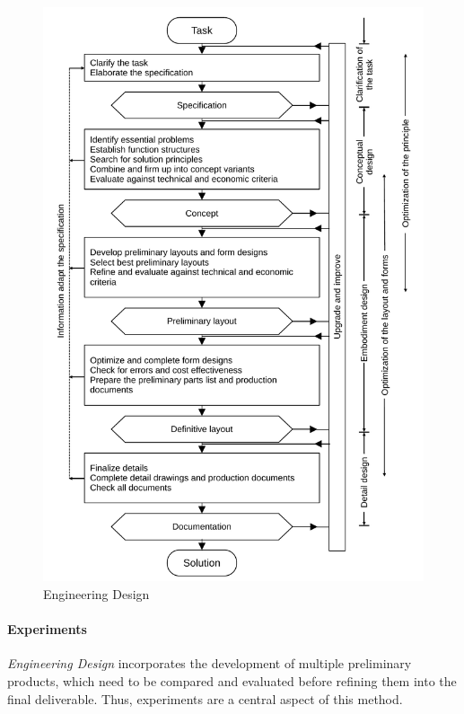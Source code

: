 \begin{figure}[htbp]
  \centering
  \includegraphics[width=\linewidth]{images/2_methodology/design_process}
  \caption{Engineering Design~\cite{Dym2012,Pahl1984}}
  \label{fig:engineering_design}
\end{figure}

\paragraph{Experiments} \emph{Engineering Design} incorporates the development of
multiple preliminary products, which need to be compared and evaluated before refining
them into the final deliverable. Thus, experiments are a central aspect of this method.


